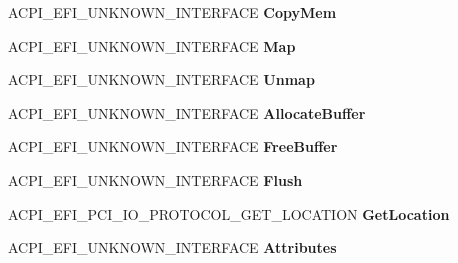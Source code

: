\begin{DoxyCompactItemize}
A\+C\+P\+I\+\_\+\+E\+F\+I\+\_\+\+U\+N\+K\+N\+O\+W\+N\+\_\+\+I\+N\+T\+E\+R\+F\+A\+CE {\bfseries Copy\+Mem}
\item 
\mbox{\label{struct___a_c_p_i___e_f_i___p_c_i___i_o_a8f6de02fed0cd865d2987c468ef69aa9}} 
A\+C\+P\+I\+\_\+\+E\+F\+I\+\_\+\+U\+N\+K\+N\+O\+W\+N\+\_\+\+I\+N\+T\+E\+R\+F\+A\+CE {\bfseries Map}
\item 
\mbox{\label{struct___a_c_p_i___e_f_i___p_c_i___i_o_ae980c3cbb0b6009d49478a4b3e551d91}} 
A\+C\+P\+I\+\_\+\+E\+F\+I\+\_\+\+U\+N\+K\+N\+O\+W\+N\+\_\+\+I\+N\+T\+E\+R\+F\+A\+CE {\bfseries Unmap}
\item 
\mbox{\label{struct___a_c_p_i___e_f_i___p_c_i___i_o_a65a14b304d32d490fa60cdce19144f5e}} 
A\+C\+P\+I\+\_\+\+E\+F\+I\+\_\+\+U\+N\+K\+N\+O\+W\+N\+\_\+\+I\+N\+T\+E\+R\+F\+A\+CE {\bfseries Allocate\+Buffer}
\item 
\mbox{\label{struct___a_c_p_i___e_f_i___p_c_i___i_o_a09f3ce2ba0a99ac9f4f3117759bda1e2}} 
A\+C\+P\+I\+\_\+\+E\+F\+I\+\_\+\+U\+N\+K\+N\+O\+W\+N\+\_\+\+I\+N\+T\+E\+R\+F\+A\+CE {\bfseries Free\+Buffer}
\item 
\mbox{\label{struct___a_c_p_i___e_f_i___p_c_i___i_o_a09ba3340b953fedb59c7d345ed38d903}} 
A\+C\+P\+I\+\_\+\+E\+F\+I\+\_\+\+U\+N\+K\+N\+O\+W\+N\+\_\+\+I\+N\+T\+E\+R\+F\+A\+CE {\bfseries Flush}
\item 
\mbox{\label{struct___a_c_p_i___e_f_i___p_c_i___i_o_a9d41f4f3d836b701896ef0c17f053f29}} 
A\+C\+P\+I\+\_\+\+E\+F\+I\+\_\+\+P\+C\+I\+\_\+\+I\+O\+\_\+\+P\+R\+O\+T\+O\+C\+O\+L\+\_\+\+G\+E\+T\+\_\+\+L\+O\+C\+A\+T\+I\+ON {\bfseries Get\+Location}
\item 
\mbox{\label{struct___a_c_p_i___e_f_i___p_c_i___i_o_ad8fd474ab672932c2b608f6572f9220a}} 
A\+C\+P\+I\+\_\+\+E\+F\+I\+\_\+\+U\+N\+K\+N\+O\+W\+N\+\_\+\+I\+N\+T\+E\+R\+F\+A\+CE {\bfseries Attributes}
\item 
\mbox{\label{struct___a_c_p_i___e_f_i___p_c_i___i_o_a8ddae1aed0c8f5558a5139916315f901}} 

\end{DoxyCompactItemize}
